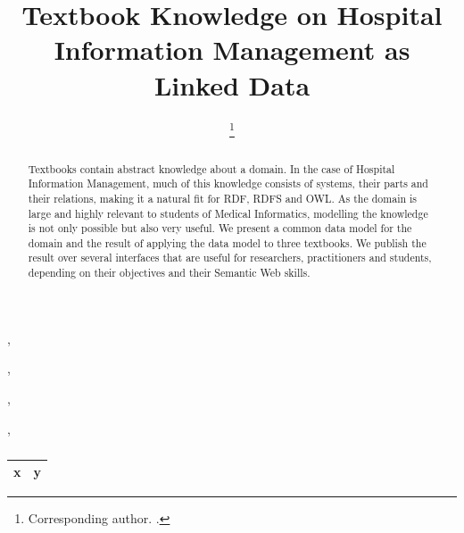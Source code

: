 \documentclass[sw]{iosart2x}
\begin{document}
\begin{frontmatter}

\title{Textbook Knowledge on Hospital Information Management as Linked Data}

\author[A]{ %
\thanks{Corresponding author. .}},
\author[A]{ },
\author[A]{ },
\author[A]{ },
\author[A]{ }
\address[A]{Institute for Medical Informatics, Statistics and Epidemiology (IMISE),
, }

\begin{abstract}
Textbooks contain abstract knowledge about a domain.
In the case of Hospital Information Management, much of this knowledge consists of systems, their parts and their relations, making it a natural fit for RDF, RDFS and OWL.
As the domain is large and highly relevant to students of Medical Informatics, modelling the knowledge is not only possible but also very useful.
We present a common data model for the domain and the result of applying the data model to three textbooks.
We publish the result over several interfaces that are useful for researchers, practitioners and students, depending on their objectives and their Semantic Web skills.
\end{abstract}

\begin{keyword}
\end{keyword}

\end{frontmatter}

\begin{table}
\caption{}
\label{tab:namespaces}
\begin{tabular}{ll}
\toprule
\textbf{x}	&\textbf{y}\\
\midrule
\bottomrule
\end{tabular}
\end{table}
\end{document}
